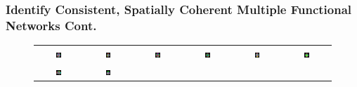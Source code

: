\documentclass[serif]{beamer}
\begin{document}
\begin{frame}
\frametitle{Identify Consistent, Spatially Coherent Multiple Functional Networks Cont.}
\begin{figure}[htb]
 \begin{center}
 \begin{tabular}{cccccc}
      \includegraphics[width=0.12\textwidth]{figures/wholebrain/sub1/axial0028} &
      \includegraphics[width=0.12\textwidth]{figures/wholebrain/sub1/axial0034} &
      \includegraphics[width=0.12\textwidth]{figures/wholebrain/sub2/axial0028} &
      \includegraphics[width=0.12\textwidth]{figures/wholebrain/sub2/axial0034} &
      \includegraphics[width=0.12\textwidth]{figures/wholebrain/sub5/axial0028} &
      \includegraphics[width=0.12\textwidth]{figures/wholebrain/sub5/axial0034} \\

      \includegraphics[width=0.12\textwidth]{figures/wholebrain/sub1/saggital0029} &
      \includegraphics[width=0.12\textwidth]{figures/wholebrain/sub1/coronal0029} &


\end{tabular}
\end{center}
\end{figure}
\end{frame}
\end{document}
